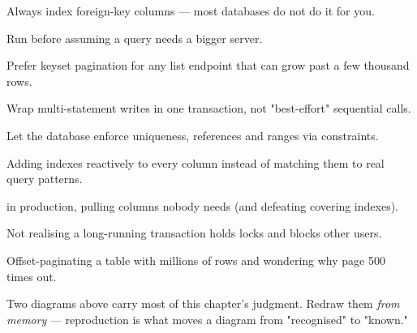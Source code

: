 \begin{bestpractices}
\begin{wbitem}
  \item Always index foreign-key columns --- most databases do not do it for you.
  \item Run  before assuming a query needs a bigger server.
  \item Prefer keyset pagination for any list endpoint that can grow past a few thousand rows.
  \item Wrap multi-statement writes in one transaction, not "best-effort" sequential calls.
  \item Let the database enforce uniqueness, references and ranges via constraints.
\end{wbitem}
\end{bestpractices}
\begin{mistakes}
\begin{wbitem}
  \item Adding indexes reactively to every column instead of matching them to real query patterns.
  \item {} in production, pulling columns nobody needs (and defeating covering indexes).
  \item Not realising a long-running transaction holds locks and blocks other users.
  \item Offset-paginating a table with millions of rows and wondering why page 500 times out.
\end{wbitem}
\end{mistakes}


Two diagrams above carry most of this chapter's judgment. Redraw them \emph{from memory} --- reproduction is what moves a diagram from "recognised" to "known."

\begin{writespace}
\end{writespace}

\begin{writespace}
\end{writespace}

